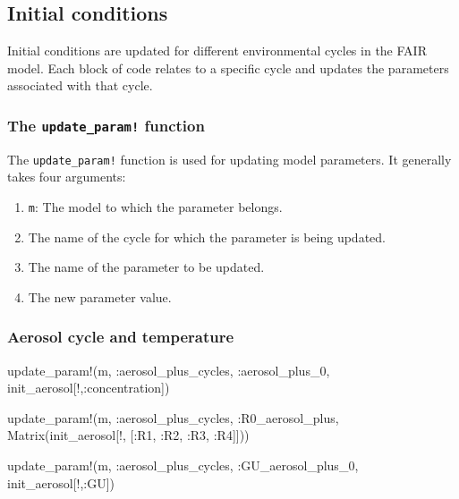 \documentclass[
]{article}
\newenvironment{Shaded}{}{}
\newcommand{\FunctionTok}[1]{\textcolor[rgb]{0.02,0.16,0.49}{#1}}
\newcommand{\NormalTok}[1]{#1}
\newcommand{\OperatorTok}[1]{\textcolor[rgb]{0.40,0.40,0.40}{#1}}
\providecommand{\tightlist}{%
  \setlength{\itemsep}{0pt}\setlength{\parskip}{0pt}}
\begin{document}
\subsection{Initial conditions}\label{initial-conditions}
Initial conditions are updated for different
environmental cycles in the FAIR model. Each block of code relates to a
specific cycle and updates the parameters associated with that cycle.

\subsubsection{\texorpdfstring{The \texttt{update\_param!}
function}{The update\_param! function}}\label{the-update_param-function}

The \texttt{update\_param!} function is used for updating model parameters.
It generally takes four arguments:

\begin{enumerate}
\def\labelenumi{\arabic{enumi}.}
\tightlist
\item
  \texttt{m}: The model to which the parameter belongs.
\item
  The name of the cycle for which the parameter is being updated.
\item
  The name of the parameter to be updated.
\item
  The new parameter value.
\end{enumerate}

\subsubsection{Aerosol cycle and
temperature}\label{aerosol-cycle-and-temperature}

\begin{Shaded}
\begin{Highlighting}[]
\FunctionTok{update\_param!}\NormalTok{(m, }\OperatorTok{:}\NormalTok{aerosol\_plus\_cycles, }\OperatorTok{:}\NormalTok{aerosol\_plus\_0, init\_aerosol[!,}\OperatorTok{:}\NormalTok{concentration])}

\FunctionTok{update\_param!}\NormalTok{(m, }\OperatorTok{:}\NormalTok{aerosol\_plus\_cycles, }\OperatorTok{:}\NormalTok{R0\_aerosol\_plus, } \\
\FunctionTok{                     Matrix}\NormalTok{(init\_aerosol[!, [}\OperatorTok{:}\NormalTok{R1, }\OperatorTok{:}\NormalTok{R2, }\OperatorTok{:}\NormalTok{R3, }\OperatorTok{:}\NormalTok{R4]]))}

\FunctionTok{update\_param!}\NormalTok{(m, }\OperatorTok{:}\NormalTok{aerosol\_plus\_cycles, }\OperatorTok{:}\NormalTok{GU\_aerosol\_plus\_0, init\_aerosol[!,}\OperatorTok{:}\NormalTok{GU])}
\end{Highlighting}
\end{Shaded}
\end{document}

